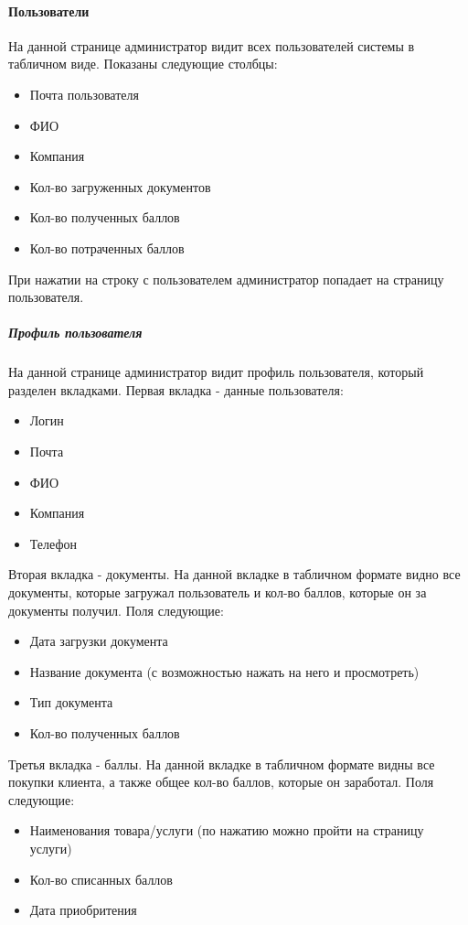 \documentclass[DIV=calc, paper=a4, fontsize=11pt]{scrartcl} %
\begin{document}
\paragraph{Пользователи}
На данной странице администратор видит всех пользователей системы в табличном виде. Показаны следующие столбцы:

\begin{itemize}
	\item Почта пользователя
	\item ФИО
	\item Компания
	\item Кол-во загруженных документов
	\item Кол-во полученных баллов
	\item Кол-во потраченных баллов
\end{itemize}

При нажатии на строку с пользователем администратор попадает на страницу пользователя.

\subparagraph{Профиль пользователя}
На данной странице администратор видит профиль пользователя, который разделен вкладками. Первая вкладка - данные пользователя:

\begin{itemize}
	\item Логин
	\item Почта
	\item ФИО
	\item Компания
	\item Телефон
\end{itemize}

Вторая вкладка - документы. На данной вкладке в табличном формате видно все документы, которые загружал пользователь и кол-во баллов, которые он за документы получил. Поля следующие:

\begin{itemize}
	\item Дата загрузки документа
	\item Название документа (с возможностью нажать на него и просмотреть)
	\item Тип документа
	\item Кол-во полученных баллов
\end{itemize}

Третья вкладка - баллы. На данной вкладке в табличном формате видны все покупки клиента, а также общее кол-во баллов, которые он заработал. Поля следующие:

\begin{itemize}
	\item Наименования товара/услуги (по нажатию можно пройти на страницу услуги)
	\item Кол-во списанных баллов
	\item Дата приобритения
\end{itemize}
\end{document}
